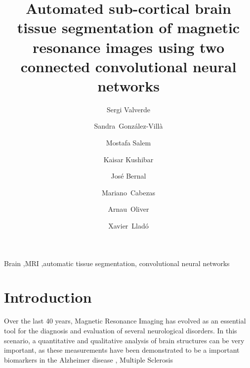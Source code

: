 \documentclass[11pt, authoryear,twocolumn, final]{elsarticle}
\begin{document}
\begin{frontmatter}


  \title{Automated sub-cortical brain tissue segmentation of magnetic resonance images using two connected convolutional neural networks}
\author[label1]{Sergi Valverde }
\author[label1]{Sandra~Gonz\'alez-Vill\`a}
\author[label1]{Mostafa Salem}
\author[label1]{Kaisar Kushibar}
\author[label1]{Jos\'e Bernal}
\author[label1]{Mariano~Cabezas}
\author[label1]{Arnau~Oliver}
\author[label1]{Xavier~Llad{\'o}}

\address[label1]{Research institute of Computer Vision and Robotics, University of Girona, Spain}


\begin{abstract}

 
\end{abstract}

\begin{keyword}
Brain \sep MRI \sep automatic tissue segmentation, convolutional neural networks
\end{keyword}
\end{frontmatter}

\newpage
\section{Introduction}
\label{sec:introduction}

Over the last 40 years, Magnetic Resonance Imaging has evolved as an essential tool for the diagnosis and evaluation of several neurological disorders. In this scenario, a quantitative and qualitative analysis of brain structures can be very important, as these measurements have been demonstrated to be a important biomarkers in the Alzheimer disease \citep{}, Multiple Sclerosis \citep{}  
\end{document}
